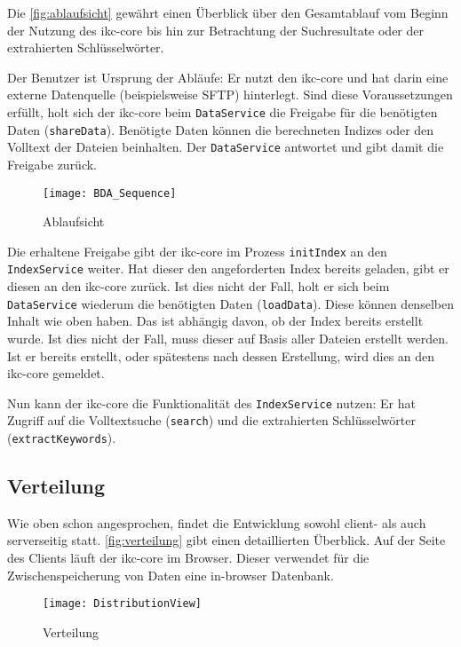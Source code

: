 
Die \autoref{fig:ablaufsicht} gewährt einen Überblick über den Gesamtablauf vom Beginn der Nutzung des \gls{ikc-core} bis hin zur Betrachtung der Suchresultate oder der extrahierten Schlüsselwörter. 

Der Benutzer ist Ursprung der Abläufe: Er nutzt den \gls{ikc-core} und hat darin eine externe Datenquelle (beispielsweise \gls{SFTP}) hinterlegt. Sind diese Voraussetzungen erfüllt, holt sich der \gls{ikc-core} beim \texttt{Da\-ta\-Ser\-vice} die Freigabe für die benötigten Daten (\texttt{shareData}). Benötigte Daten können die berechneten Indizes oder den Volltext der Dateien beinhalten. Der \texttt{DataService} antwortet und gibt damit die Freigabe zurück. 

\begin{figure}[h]
\centering
\texttt{[image: BDA\_Sequence]}
\caption{Ablaufsicht}
\label{fig:ablaufsicht}
\end{figure}

Die erhaltene Freigabe gibt der \gls{ikc-core} im Prozess \texttt{initIndex} an den \texttt{IndexService} weiter. Hat dieser den angeforderten Index bereits geladen, gibt er diesen an den \gls{ikc-core} zurück. Ist dies nicht der Fall, holt er sich beim \texttt{Data\-Service} wiederum die benötigten Daten (\texttt{loadData}). Diese können denselben Inhalt wie oben haben. Das ist abhängig davon, ob der Index bereits erstellt wurde. Ist dies nicht der Fall, muss dieser auf Basis aller Dateien erstellt werden. Ist er bereits erstellt, oder spätestens nach dessen Erstellung, wird dies an den \gls{ikc-core} gemeldet.

Nun kann der \gls{ikc-core} die Funktionalität des \texttt{IndexService} nutzen: Er hat Zugriff auf die Volltextsuche (\texttt{search}) und die extrahierten Schlüsselwörter (\texttt{extractKeywords}). 



\subsection{Verteilung}


Wie oben schon angesprochen, findet die Entwicklung sowohl client- als auch serverseitig statt. \autoref{fig:verteilung} gibt einen detaillierten Üb\-er\-blick. Auf der Seite des Clients läuft der \gls{ikc-core} im Browser. Dieser verwendet für die Zwischenspeicherung von Daten eine \gls{in-browser Datenbank}.

    
        \begin{figure}[H]
    \centering
    \texttt{[image: DistributionView]}
    \caption{Verteilung}
    \label{fig:verteilung}
    \end{figure}
